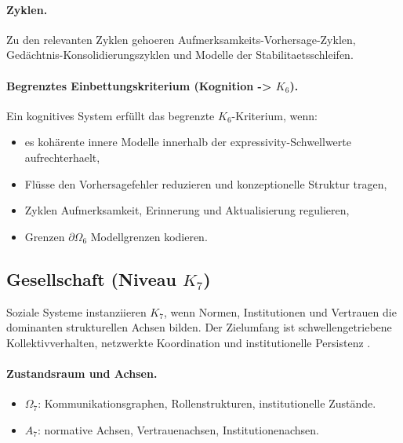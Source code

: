 \paragraph{Zyklen.}
Zu den relevanten Zyklen gehoeren Aufmerksamkeits-Vorhersage-Zyklen,
Gedächtnis-Konsolidierungszyklen und Modelle der Stabilitaetsschleifen.

\paragraph{Begrenztes Einbettungskriterium (Kognition -> \texorpdfstring{\(K_6\)}{K6}).}
Ein kognitives System erfüllt das begrenzte \(K_6\)-Kriterium, wenn:
\begin{itemize}
  \item es kohärente innere Modelle innerhalb der
        expressivity-Schwellwerte aufrechterhaelt,
  \item Flüsse den Vorhersagefehler reduzieren und konzeptionelle Struktur
        tragen,
  \item Zyklen Aufmerksamkeit, Erinnerung und Aktualisierung regulieren,
  \item Grenzen \(\partial\Omega_6\) Modellgrenzen kodieren.
\end{itemize}

\subsection{Gesellschaft (Niveau \texorpdfstring{$K_7$}{K7})}

Soziale Systeme instanziieren \(K_7\), wenn Normen, Institutionen und Vertrauen
die dominanten strukturellen Achsen bilden.
Der Zielumfang ist schwellengetriebene Kollektivverhalten, netzwerkte Koordination
und institutionelle Persistenz \parencite{granovetter_threshold,schelling_micromotives,newman_networks}.

\paragraph{Zustandsraum und Achsen.}
\begin{itemize}
  \item \(\Omega_7\): Kommunikationsgraphen, Rollenstrukturen,
        institutionelle Zustände.
  \item \(A_7\): normative Achsen, Vertrauenachsen, Institutionenachsen.
\end{itemize}

